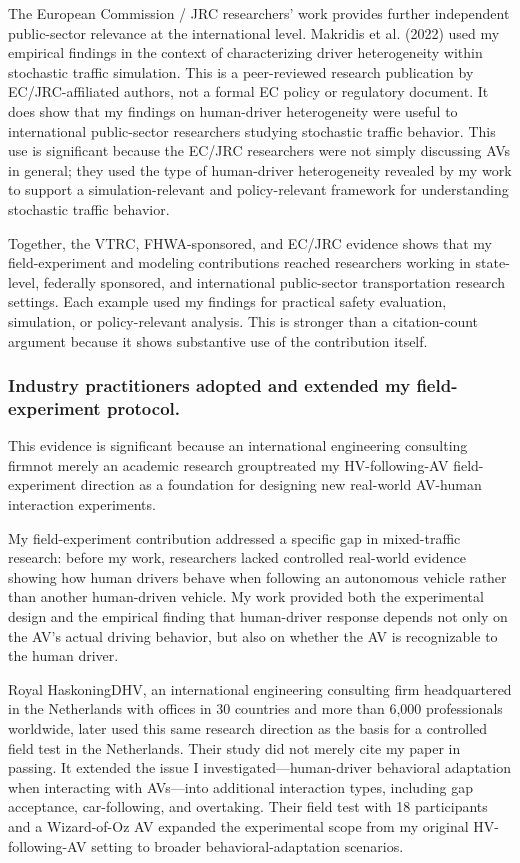 \documentclass[11pt,letterpaper]{article}
\begin{document}
The European Commission / JRC researchers' work provides further independent public-sector relevance at the international level. Makridis et al. (2022) used my empirical findings in the context of characterizing driver heterogeneity within stochastic traffic simulation. This is a peer-reviewed research publication by EC/JRC-affiliated authors, not a formal EC policy or regulatory document. It does show that my findings on human-driver heterogeneity were useful to international public-sector researchers studying stochastic traffic behavior. This use is significant because the EC/JRC researchers were not simply discussing AVs in general; they used the type of human-driver heterogeneity revealed by my work to support a simulation-relevant and policy-relevant framework for understanding stochastic traffic behavior.

Together, the VTRC, FHWA-sponsored, and EC/JRC evidence shows that my field-experiment and modeling contributions reached researchers working in state-level, federally sponsored, and international public-sector transportation research settings. Each example used my findings for practical safety evaluation, simulation, or policy-relevant analysis. This is stronger than a citation-count argument because it shows substantive use of the contribution itself.

\subsubsection{Industry practitioners adopted and extended my field-experiment protocol.}

This evidence is significant because an international engineering consulting firm\textemdash not merely an academic research group\textemdash treated my HV-following-AV field-experiment direction as a foundation for designing new real-world AV-human interaction experiments.

My field-experiment contribution addressed a specific gap in mixed-traffic research: before my work, researchers lacked controlled real-world evidence showing how human drivers behave when following an autonomous vehicle rather than another human-driven vehicle. My work provided both the experimental design and the empirical finding that human-driver response depends not only on the AV's actual driving behavior, but also on whether the AV is recognizable to the human driver.

Royal HaskoningDHV, an international engineering consulting firm headquartered in the Netherlands with offices in 30 countries and more than 6,000 professionals worldwide, later used this same research direction as the basis for a controlled field test in the Netherlands. Their study did not merely cite my paper in passing. It extended the issue I investigated---human-driver behavioral adaptation when interacting with AVs---into additional interaction types, including gap acceptance, car-following, and overtaking. Their field test with 18 participants and a Wizard-of-Oz AV expanded the experimental scope from my original HV-following-AV setting to broader behavioral-adaptation scenarios.
\end{document}
